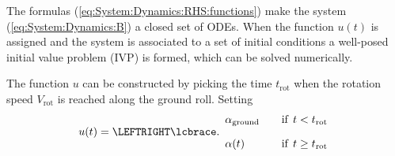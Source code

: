 \documentclass[12pt,twoside]{book}
\begin{document}
The formulas (\ref{eq:System:Dynamics:RHS:functions}) make the system (\ref{eq:System:Dynamics:B})
a closed set of ODEs.
When the function $u(t)$ is assigned and the system is associated to a set of initial conditions a well-posed
initial value problem (IVP) is formed, which can be solved numerically.

The function $u$ can be constructed by picking the time $t_{\text{rot}}$ when the rotation speed $V_{\text{rot}}$ 
is reached along the ground roll. Setting
\begin{equation}\label{eq:System:Dynamics:Alpha:Law}
u (t) =
    \LEFTRIGHT\lcbrace.{
      \begin{array}{l@{\rule{2em}{0pt}}l} 
        \alpha_{\text{ground}}
          & \text{if} \;\, t < t_{\text{rot}}
        \\[1em]
        \alpha(t)
          & \text{if} \;\, t \geq t_{\text{rot}}
      \end{array}
    }  
\end{equation}
\end{document}
